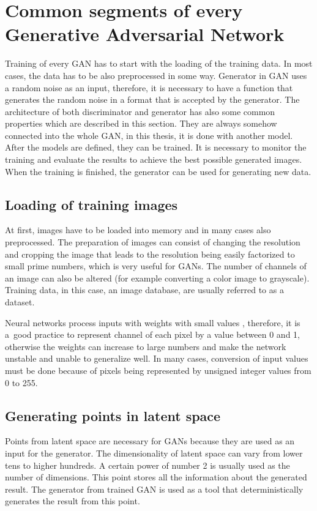 \section{\label{sec:common-gans}Common segments of every Generative Adversarial Network}
Training of every GAN has to start with the loading of the training data. In most cases, the data has to be also preprocessed in some way. Generator in GAN uses a random noise as an input, therefore, it is necessary to have a function that generates the random noise in a format that is accepted by the generator. The architecture of both discriminator and generator has also some common properties which are described in this section. They are always somehow connected into the whole GAN, in this thesis, it is done with another model. After the models are defined, they can be trained. It is necessary to monitor the training and evaluate the results to achieve the best possible generated images. When the training is finished, the generator can be used for generating new data.

\subsection*{\label{sec:common-loading}Loading of training images}
At first, images have to be loaded into memory and in many cases also preprocessed. The preparation of images can consist of changing the resolution and cropping the image that leads to the resolution being easily factorized to small prime numbers, which is very useful for GANs. The number of channels of an image can also be altered (for example converting a color image to grayscale). Training data, in this case, an image database, are usually referred to as a dataset.

Neural networks process inputs with weights with small values \cite{Goodfellow-et-al-2016}, therefore, it is a~good practice to represent channel of each pixel by a value between 0 and 1, otherwise the weights can increase to large numbers and make the network unstable and unable to generalize well. In many cases, conversion of input values must be done because of pixels being represented by unsigned integer values from 0 to 255.

\subsection*{Generating points in latent space}
Points from latent space are necessary for GANs because they are used as an input for the generator. The dimensionality of latent space can vary from lower tens to higher hundreds. A certain power of number 2 is usually used as the number of dimensions. This point stores all the information about the generated result. The generator from trained GAN is used as a tool that deterministically generates the result from this point.

